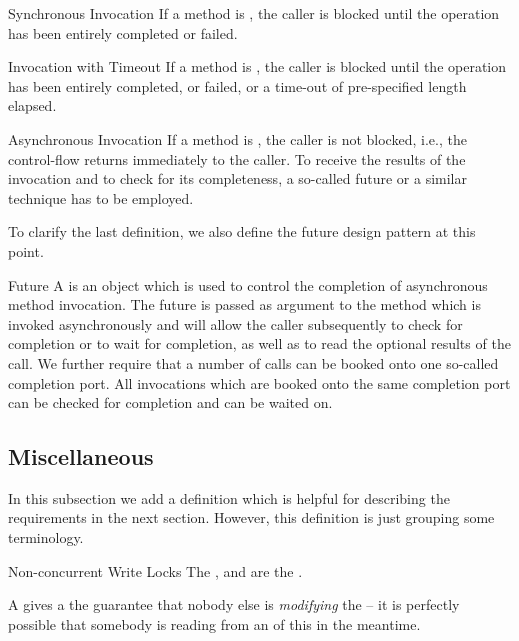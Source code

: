 \documentclass[a4paper, 12pt]{book}
\begin{document}
\begin{definition*}{Synchronous Invocation}
  If a method is , the caller is blocked until the
  operation has been entirely completed or failed. 
\end{definition*}
%
\begin{definition*}{Invocation with Timeout}
  If a method is , the caller is blocked until the
  operation has been entirely completed, or failed, or a time-out of pre-specified
  length elapsed. 
\end{definition*}
%
\begin{definition*}{Asynchronous Invocation}
  If a method is , the caller is not blocked, i.e.,
  the control-flow returns immediately to the caller. To receive the results
  of the invocation and to check for its completeness, a so-called future or a
  similar technique has to be employed. 
\end{definition*}
%
To clarify the last definition, we also define the future design
pattern at this point.
%
\begin{definition*}{Future}
  A  is an object which is used to control the completion
  of asynchronous method invocation. The future is passed as argument
  to the method which is invoked asynchronously and will allow the
  caller subsequently to check for completion or to wait for
  completion, as well as to read the optional results of the call. 
  We further require that a number of calls can be booked onto one
  so-called completion port. All invocations which are booked onto the
  same completion port can be checked for completion and can be waited
  on. 
\end{definition*}


\subsection{Miscellaneous}

In this subsection we add a definition which is helpful for describing the
requirements in the next section. However, this definition is just grouping
some terminology. 

\begin{definition*}{Non-concurrent Write Locks}
  The  \PROTWRITE, \EXCLUSIVE and \TRANSWRITE are the
  .
\end{definition*}
%
A  gives a  the guarantee that
nobody else is \emph{modifying} the  -- it is perfectly possible that
somebody is reading from an  of this  in the
meantime.
\end{document}
